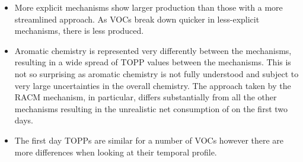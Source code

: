 \begin{BlueBox}
    \vskip-1cm
    \begin{block}{}
        \begin{itemize}
            \item More explicit mechanisms show larger  production than those with a more streamlined approach. As VOCs break down 
            quicker in less-explicit mechanisms, there is less  produced. \vspace{5mm}

            \item Aromatic chemistry is represented very differently between the mechanisms, resulting in a wide spread of TOPP values between 
            the mechanisms. This is not so surprising as aromatic chemistry is not fully understood and subject to very large uncertainties in the
            overall chemistry. The approach taken by the RACM mechanism, in particular, differs substantially from all the other mechanisms 
            resulting in the unrealistic net consumption of  on the first two days.\vspace{5mm}

            \item The first day TOPPs are similar for a number of VOCs however there are more differences when looking at their temporal 
            profile. \vspace{5mm}
        \end{itemize}        
    \end{block}
\end{BlueBox}

